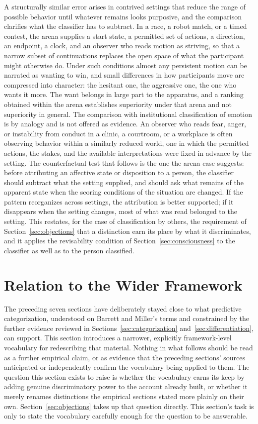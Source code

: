 \documentclass[11pt]{article}
\begin{document}
A structurally similar error arises in contrived settings that reduce the range of possible behavior until whatever remains looks purposive, and the comparison clarifies what the classifier has to subtract. In a race, a robot match, or a timed contest, the arena supplies a start state, a permitted set of actions, a direction, an endpoint, a clock, and an observer who reads motion as striving, so that a narrow subset of continuations replaces the open space of what the participant might otherwise do. Under such conditions almost any persistent motion can be narrated as wanting to win, and small differences in how participants move are compressed into character: the hesitant one, the aggressive one, the one who wants it more. The want belongs in large part to the apparatus, and a ranking obtained within the arena establishes superiority under that arena and not superiority in general. The comparison with institutional classification of emotion is by analogy and is not offered as evidence. An observer who reads fear, anger, or instability from conduct in a clinic, a courtroom, or a workplace is often observing behavior within a similarly reduced world, one in which the permitted actions, the stakes, and the available interpretations were fixed in advance by the setting. The counterfactual test that follows is the one the arena case suggests: before attributing an affective state or disposition to a person, the classifier should subtract what the setting supplied, and should ask what remains of the apparent state when the scoring conditions of the situation are changed. If the pattern reorganizes across settings, the attribution is better supported; if it disappears when the setting changes, most of what was read belonged to the setting. This restates, for the case of classification by others, the requirement of Section~\ref{sec:objections} that a distinction earn its place by what it discriminates, and it applies the revisability condition of Section~\ref{sec:consciousness} to the classifier as well as to the person classified.

\section{Relation to the Wider Framework}\label{sec:framework}

The preceding seven sections have deliberately stayed close to what predictive categorization, understood on Barrett and Miller's terms and constrained by the further evidence reviewed in Sections~\ref{sec:categorization} and~\ref{sec:differentiation}, can support. This section introduces a narrower, explicitly framework-level vocabulary for redescribing that material. Nothing in what follows should be read as a further empirical claim, or as evidence that the preceding sections' sources anticipated or independently confirm the vocabulary being applied to them. The question this section exists to raise is whether the vocabulary earns its keep by adding genuine discriminatory power to the account already built, or whether it merely renames distinctions the empirical sections stated more plainly on their own. Section~\ref{sec:objections} takes up that question directly. This section's task is only to state the vocabulary carefully enough for the question to be answerable.
\end{document}
